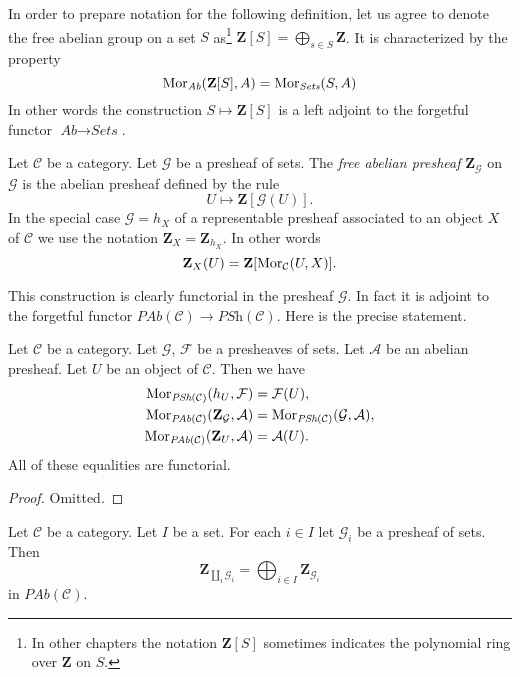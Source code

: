 \noindent
In order to prepare notation for the following definition, let us agree
to denote the free abelian group on a set $S$ as\footnote{In other chapters
the notation $\mathbf{Z}[S]$ sometimes indicates the polynomial ring over
$\mathbf{Z}$ on $S$.}
$\mathbf{Z}[S] = \bigoplus_{s \in S} \mathbf{Z}$. It is characterized
by the property
$$
\mathop{\rm Mor}\nolimits_{\textit{Ab}}(\mathbf{Z}[S], A)
=
\mathop{\rm Mor}\nolimits_{\textit{Sets}}(S, A)
$$
In other words the construction $S \mapsto \mathbf{Z}[S]$ is a left adjoint
to the forgetful functor $\textit{Ab} \to \textit{Sets}$.

\begin{definition}
\label{definition-free-abelian-presheaf-on}
Let $\mathcal{C}$ be a category. Let $\mathcal{G}$ be a presheaf of sets.
The {\it free abelian presheaf} $\mathbf{Z}_\mathcal{G}$ on $\mathcal{G}$
is the abelian presheaf defined by the rule
$$
U \longmapsto \mathbf{Z}[\mathcal{G}(U)].
$$
In the special case $\mathcal{G} = h_X$ of a representable presheaf
associated to an object $X$ of $\mathcal{C}$
we use the notation $\mathbf{Z}_X = \mathbf{Z}_{h_X}$. In other words
$$
\mathbf{Z}_X(U) = \mathbf{Z}[\mathop{\rm Mor}\nolimits_\mathcal{C}(U, X)].
$$
\end{definition}

\noindent
This construction is clearly functorial in the presheaf $\mathcal{G}$.
In fact it is adjoint to the forgetful functor
$\textit{PAb}(\mathcal{C}) \to \textit{PSh}(\mathcal{C})$.
Here is the precise statement.

\begin{lemma}
\label{lemma-obvious-adjointness}
Let $\mathcal{C}$ be a category.
Let $\mathcal{G}$, $\mathcal{F}$ be a presheaves of sets.
Let $\mathcal{A}$ be an abelian presheaf.
Let $U$ be an object of $\mathcal{C}$. Then
we have
\begin{align*}
\mathop{\rm Mor}\nolimits_{\textit{PSh}(\mathcal{C})}(h_U, \mathcal{F})
& =
\mathcal{F}(U), \\
\mathop{\rm Mor}\nolimits_{\textit{PAb}(\mathcal{C})}(\mathbf{Z}_\mathcal{G}, \mathcal{A})
& =
\mathop{\rm Mor}\nolimits_{\textit{PSh}(\mathcal{C})}(\mathcal{G}, \mathcal{A}), \\
\mathop{\rm Mor}\nolimits_{\textit{PAb}(\mathcal{C})}(\mathbf{Z}_U, \mathcal{A})
& =
\mathcal{A}(U).
\end{align*}
All of these equalities are functorial.
\end{lemma}

\begin{proof}
Omitted.
\end{proof}

\begin{lemma}
\label{lemma-coproduct-sum-free-abelian-presheaf}
Let $\mathcal{C}$ be a category.
Let $I$ be a set. For each $i \in I$ let
$\mathcal{G}_i$ be a presheaf of sets.
Then
$$
\mathbf{Z}_{\coprod_i \mathcal{G}_i}
=
\bigoplus\nolimits_{i \in I} \mathbf{Z}_{\mathcal{G}_i}
$$
in $\textit{PAb}(\mathcal{C})$.
\end{lemma}

